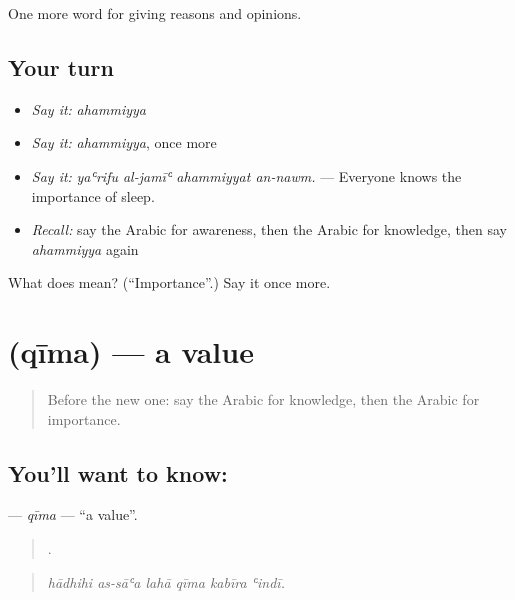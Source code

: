 \begin{grammarlens}[title={What you've built}]
One more word for giving reasons and opinions.
\end{grammarlens}

\subsection*{Your turn}
\begin{itemize}
\raggedright
  \item \emph{Say it:} \emph{ahammiyya}
  \item \emph{Say it:} \emph{ahammiyya}, once more
  \item \emph{Say it:} \emph{yaʿrifu al-jamīʿ ahammiyyat an-nawm.} — Everyone knows the importance of sleep.
  \item \emph{Recall:} say the Arabic for awareness, then the Arabic for knowledge, then say \emph{ahammiyya} again
\end{itemize}

\begin{tcolorbox}[breakable,colback=teal!4,colframe=teal!35!black,title={Before you move on}]
What does  mean? (\textquotedblleft{}Importance\textquotedblright{}.) Say it once more.
\end{tcolorbox}
\section[\texorpdfstring{\ar{قيمة} (qīma)}{قيمة (qīma)}]{ (qīma) — a value}

\label{lesson:AR-C368-qima}



\begin{quote}
Before the new one: say the Arabic for knowledge, then the Arabic for importance.
\end{quote}

\subsection*{You'll want to know: }
\textbf{} — \emph{qīma} — \textquotedblleft{}a value\textquotedblright{}.

\begin{quote}
     .
\end{quote}

\begin{quote}
\emph{hādhihi as-sāʿa lahā qīma kabīra ʿindī.}
\end{quote}

